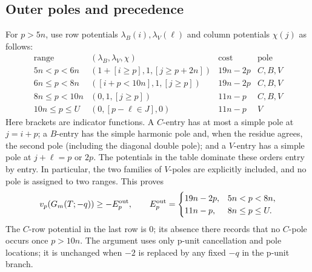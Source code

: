 \subsection{Outer poles and precedence}

For \(p>5n\), use row potentials \(\lambda_B(i),\lambda_V(\ell)\) and
column potentials \(\chi(j)\) as follows:
\[
\begin{array}{c|c|c|c}
 \text{range}&(\lambda_B,\lambda_V,\chi)&\text{cost}&\text{pole}\\ \hline
 5n<p<6n&(1+[i\ge p],1,[j\ge p+2n])&19n-2p&C,B,V\\
 6n\le p<8n&([i+p<10n],1,[j\ge p])&19n-2p&C,B,V\\
 8n\le p<10n&(0,1,[j\ge p])&11n-p&C,B,V\\
 10n\le p\le U&(0,[p-\ell\in J],0)&11n-p&V
\end{array}
\]
Here brackets are indicator functions.  A \(C\)-entry has at most a simple
pole at \(j=i+p\); a \(B\)-entry has the simple harmonic pole and, when the
residue agrees, the second pole (including the diagonal double pole); and a
\(V\)-entry has a simple pole at \(j+\ell=p\) or \(2p\).  The potentials in
the table dominate these orders entry by entry.  In particular, the two
families of \(V\)-poles are explicitly included, and no pole is assigned to
two ranges.  This proves
\[
 v_p(G_m(T;-q))\ge-E_p^{\rm out},\qquad
 E_p^{\rm out}=\begin{cases}19n-2p,&5n<p<8n,\\11n-p,&8n\le p\le U.
\end{cases}
\]
The \(C\)-row potential in the last row is \(0\); its absence there records
that no \(C\)-pole occurs once \(p>10n\).
The argument uses only p-unit cancellation and pole locations; it is unchanged
when \(-2\) is replaced by any fixed \(-q\) in the p-unit branch.

